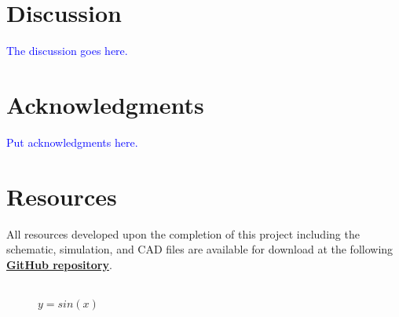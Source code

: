 \documentclass[10pt]{article}
\begin{document}
\begin{multicols*}{2}
        \section{Discussion}
            \textcolor{blue}{The discussion goes here.}

        \section*{Acknowledgments}
            \textcolor{blue}{Put acknowledgments here. }

        \section*{Resources}
            All resources developed upon the completion of this project including the schematic, simulation, and CAD files are available for download at the following \textbf{\textcolor{github-butterfly-bush}{\href{https://github.com/ShaunG-RU/DRC-Project}{GitHub repository}}}.

        \printbibliography

        \begin{figure*}[!th]

            \centering

            \begin{minipage}[b]{0.2\linewidth}
                \centering
                \\
                \footnotesize{$y=sin(x)$}
            \end{minipage}\hfill


\end{figure*}
\end{multicols*}
\end{document}
